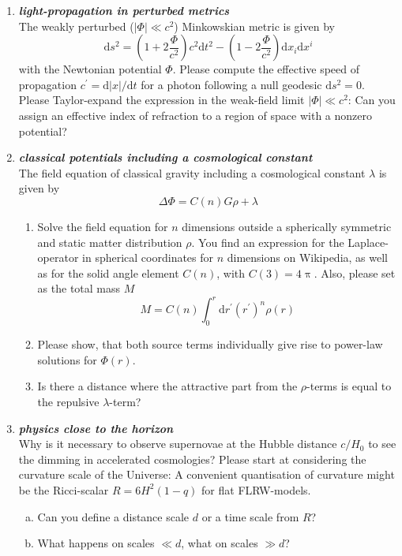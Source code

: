 \documentclass[a4paper,12pt]{article}
\newcommand{\question}[1]{\textbf{\textit{#1}}}
\newcommand{\dd}{\mathrm{d}}
\renewcommand{\pi}{\uppi}
\begin{document}
\begin{enumerate}
\item \question{light-propagation in perturbed metrics}\\
The weakly perturbed ($\left|\Phi\right|\ll c^2$) Minkowskian metric is given by 
\begin{equation}
\dd s^2 = \left(1+2\frac{\Phi}{c^2}\right) c^2\dd t^2 - \left(1-2\frac{\Phi}{c^2}\right)\dd x_i\dd x^i
\end{equation}
with the Newtonian potential $\Phi$. Please compute the effective speed of propagation $c^\prime = \dd\left|x\right|/\dd t$ for a photon following a null geodesic $\dd s^2=0$. Please Taylor-expand the expression in the weak-field limit $\left|\Phi\right|\ll c^2$: Can you assign an effective index of refraction to a region of space with a nonzero potential?


\item \question{classical potentials including a cosmological constant}\\
The field equation of classical gravity including a cosmological constant $\lambda$ is given by
\begin{equation}
\Delta\Phi = C(n) G\rho + \lambda
\end{equation}
\begin{enumerate}
\item{Solve the field equation for $n$ dimensions outside a spherically symmetric and static matter distribution $\rho$. You find an expression for the Laplace-operator in spherical coordinates for $n$ dimensions on Wikipedia, as well as for the solid angle element $C(n)$, with $C(3)=4\pi$. Also, please set as the total mass $M$
\begin{equation}
M = C(n)\int_0^r\dd r^\prime (r^\prime)^n\rho(r)
\end{equation}
}
\item{Please show, that both source terms individually give rise to power-law solutions for $\Phi(r)$.}
\item{Is there a distance where the attractive part from the $\rho$-terms is equal to the repulsive $\lambda$-term?}
\end{enumerate}


\item \question{physics close to the horizon}\\
Why is it necessary to observe supernovae at the Hubble distance $c/H_0$ to see the dimming in accelerated cosmologies? Please start at considering the curvature scale of the Universe: A convenient quantisation of curvature might be the Ricci-scalar $R = 6H^2(1-q)$ for flat FLRW-models.
\begin{enumerate}[(a)]
\item{Can you define a distance scale $d$ or a time scale from $R$?}
\item{What happens on scales $\ll d$, what on scales $\gg d$?}
\end{enumerate}



\end{enumerate}
\end{document}
